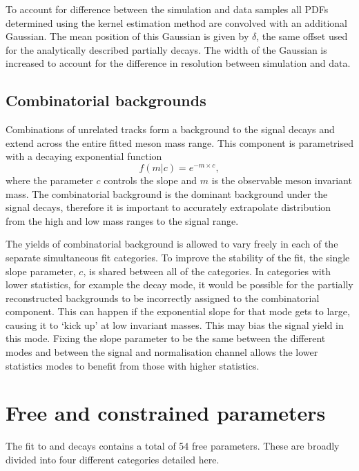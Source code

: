To account for difference between the simulation and data samples all PDFs determined using the kernel estimation method are convolved with an additional Gaussian. The mean position of this Gaussian is given by $\delta$, the same offset used for the analytically described partially decays. The width of the Gaussian is increased to account for the difference in resolution between simulation and data. 


\subsection{Combinatorial  backgrounds}
\label{sec:B2DsPhi_combcomps}

Combinations of unrelated tracks form a background to the signal decays and extend across the entire fitted \Bp meson mass range. 
This component is parametrised with a decaying exponential function 
\begin{equation}
f(m|c) = e^{-m\times c},
\end{equation}
where the parameter $c$ controls the slope and $m$ is the observable \Bp meson invariant mass. 
The combinatorial background is the dominant background under the signal decays, therefore it is important to accurately extrapolate distribution from the high and low mass ranges to the signal range. 

The yields of combinatorial background is allowed to vary freely in each of the separate simultaneous fit categories. To improve the stability of the fit, the single slope parameter, $c$, is shared between all of the categories. In categories with lower statistics, for example the \decay{\Dsp}{\Kp\pim\pip} decay mode, it would be possible for the partially reconstructed backgrounds to be incorrectly assigned to the combinatorial component. This can happen if the exponential slope for that mode gets to large, causing it to `kick up' at low invariant masses. This may bias the signal yield in this mode. Fixing the slope parameter to be the same between the different \Dsp modes and between the signal and normalisation channel allows the lower statistics modes to benefit from those with higher statistics.

\section{Free and constrained parameters}

The fit to \decay{\Bp}{\Dsp\phiz} and \decay{\Bp}{\Dsp\Dzb} decays contains a total of 54 free parameters. 
These are broadly divided into four different categories detailed here.

